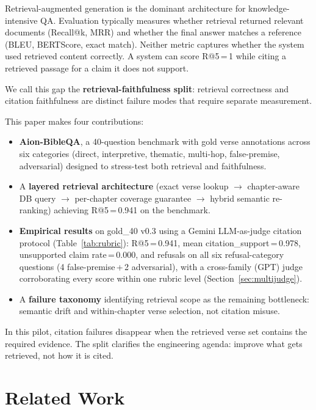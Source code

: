 \documentclass[11pt]{article}
\begin{document}
Retrieval-augmented generation \citep{lewis2020rag} is the dominant architecture for knowledge-intensive QA.
Evaluation typically measures whether retrieval returned relevant documents (Recall@k, MRR) and whether the final answer matches a reference (BLEU, BERTScore, exact match).
Neither metric captures whether the system used retrieved content correctly.
A system can score R@5\,=\,1 while citing a retrieved passage for a claim it does not support.

We call this gap the \textbf{retrieval-faithfulness split}: retrieval correctness and citation faithfulness are distinct failure modes that require separate measurement.

This paper makes four contributions:

\begin{itemize}
  \item \textbf{Aion-BibleQA}, a 40-question benchmark with gold verse annotations across six categories (direct, interpretive, thematic, multi-hop, false-premise, adversarial) designed to stress-test both retrieval and faithfulness.
  \item A \textbf{layered retrieval architecture} (exact verse lookup $\rightarrow$ chapter-aware DB query $\rightarrow$ per-chapter coverage guarantee $\rightarrow$ hybrid semantic re-ranking) achieving R@5\,=\,0.941 on the benchmark.
  \item \textbf{Empirical results} on gold\_40 v0.3 using a Gemini LLM-as-judge citation protocol (Table~\ref{tab:rubric}): R@5\,=\,0.941, mean citation\_support\,=\,0.978, unsupported claim rate\,=\,0.000, and refusals on all six refusal-category questions (4 false-premise\,+\,2 adversarial), with a cross-family (GPT) judge corroborating every score within one rubric level (Section~\ref{sec:multijudge}).
  \item A \textbf{failure taxonomy} identifying retrieval scope as the remaining bottleneck: semantic drift and within-chapter verse selection, not citation misuse.
\end{itemize}

In this pilot, citation failures disappear when the retrieved verse set contains the required evidence.
The split clarifies the engineering agenda: improve what gets retrieved, not how it is cited.

\section{Related Work}
\end{document}
